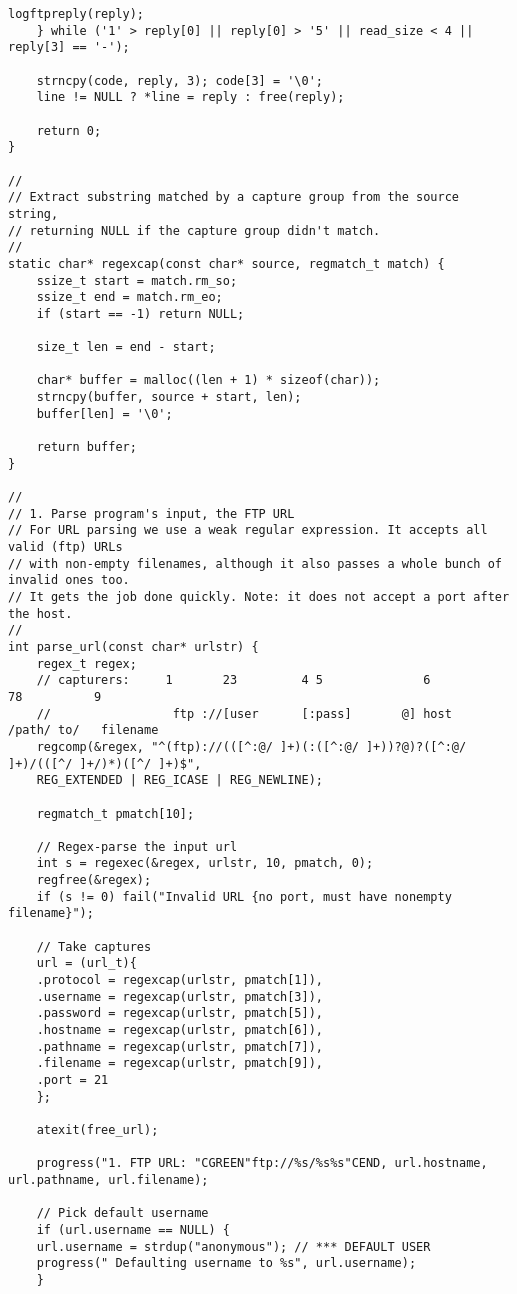 \documentclass[subfiles]{main.tex}
\begin{document}
\begin{lstlisting}[style=C-sublime]
	logftpreply(reply);
	} while ('1' > reply[0] || reply[0] > '5' || read_size < 4 || reply[3] == '-');
	
	strncpy(code, reply, 3); code[3] = '\0';
	line != NULL ? *line = reply : free(reply);
	
	return 0;
}

//
// Extract substring matched by a capture group from the source string,
// returning NULL if the capture group didn't match.
//
static char* regexcap(const char* source, regmatch_t match) {
	ssize_t start = match.rm_so;
	ssize_t end = match.rm_eo;
	if (start == -1) return NULL;
	
	size_t len = end - start;
	
	char* buffer = malloc((len + 1) * sizeof(char));
	strncpy(buffer, source + start, len);
	buffer[len] = '\0';
	
	return buffer;
}

//
// 1. Parse program's input, the FTP URL
// For URL parsing we use a weak regular expression. It accepts all valid (ftp) URLs
// with non-empty filenames, although it also passes a whole bunch of invalid ones too.
// It gets the job done quickly. Note: it does not accept a port after the host.
//
int parse_url(const char* urlstr) {
	regex_t regex;
	// capturers:     1       23         4 5              6          78          9
	//                 ftp ://[user      [:pass]       @] host      /path/ to/   filename
	regcomp(&regex, "^(ftp)://(([^:@/ ]+)(:([^:@/ ]+))?@)?([^:@/ ]+)/(([^/ ]+/)*)([^/ ]+)$",
	REG_EXTENDED | REG_ICASE | REG_NEWLINE);
	
	regmatch_t pmatch[10];
	
	// Regex-parse the input url
	int s = regexec(&regex, urlstr, 10, pmatch, 0);
	regfree(&regex);
	if (s != 0) fail("Invalid URL {no port, must have nonempty filename}");
	
	// Take captures
	url = (url_t){
	.protocol = regexcap(urlstr, pmatch[1]),
	.username = regexcap(urlstr, pmatch[3]),
	.password = regexcap(urlstr, pmatch[5]),
	.hostname = regexcap(urlstr, pmatch[6]),
	.pathname = regexcap(urlstr, pmatch[7]),
	.filename = regexcap(urlstr, pmatch[9]),
	.port = 21
	};
	
	atexit(free_url);
	
	progress("1. FTP URL: "CGREEN"ftp://%s/%s%s"CEND, url.hostname, url.pathname, url.filename);
	
	// Pick default username
	if (url.username == NULL) {
	url.username = strdup("anonymous"); // *** DEFAULT USER
	progress(" Defaulting username to %s", url.username);
	}
	

\end{lstlisting}
\end{document}
